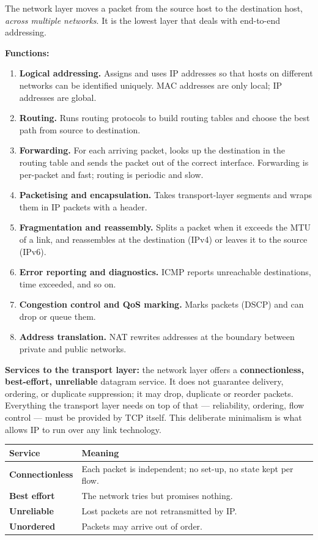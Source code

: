 \documentclass[11pt,a4paper]{article}
\begin{document}
\begin{solbox}
The network layer moves a packet from the source host to the destination host, \emph{across multiple networks}. It is the lowest layer that deals with end-to-end addressing.

\textbf{Functions:}

\begin{enumerate}
\item \textbf{Logical addressing.} Assigns and uses IP addresses so that hosts on different networks can be identified uniquely. MAC addresses are only local; IP addresses are global.
\item \textbf{Routing.} Runs routing protocols to build routing tables and choose the best path from source to destination.
\item \textbf{Forwarding.} For each arriving packet, looks up the destination in the routing table and sends the packet out of the correct interface. Forwarding is per-packet and fast; routing is periodic and slow.
\item \textbf{Packetising and encapsulation.} Takes transport-layer segments and wraps them in IP packets with a header.
\item \textbf{Fragmentation and reassembly.} Splits a packet when it exceeds the MTU of a link, and reassembles at the destination (IPv4) or leaves it to the source (IPv6).
\item \textbf{Error reporting and diagnostics.} ICMP reports unreachable destinations, time exceeded, and so on.
\item \textbf{Congestion control and QoS marking.} Marks packets (DSCP) and can drop or queue them.
\item \textbf{Address translation.} NAT rewrites addresses at the boundary between private and public networks.
\end{enumerate}

\textbf{Services to the transport layer:} the network layer offers a \textbf{connectionless, best-effort, unreliable} datagram service. It does not guarantee delivery, ordering, or duplicate suppression; it may drop, duplicate or reorder packets. Everything the transport layer needs on top of that --- reliability, ordering, flow control --- must be provided by TCP itself. This deliberate minimalism is what allows IP to run over any link technology.

\begin{center}\small
\begin{tabularx}{\textwidth}{>{\bfseries}p{} X}
\toprule Service & Meaning\\
\midrule
Connectionless & Each packet is independent; no set-up, no state kept per flow.\\
Best effort & The network tries but promises nothing.\\
Unreliable & Lost packets are not retransmitted by IP.\\
Unordered & Packets may arrive out of order.\\
\bottomrule
\end{tabularx}
\end{center}


\end{solbox}
\end{document}
